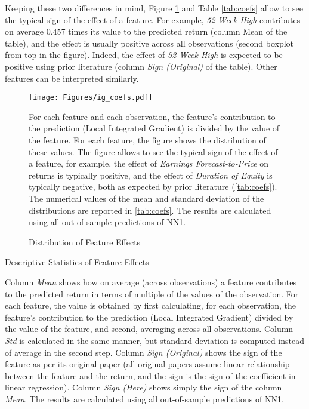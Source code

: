 	Keeping these two differences in mind, Figure \ref{fig:coefs} and Table \ref{tab:coefs} allow to see the typical sign of the effect of a feature. For example, \textit{52-Week High} contributes on average 0.457 times its value to the predicted return (column Mean of the table), and the effect is usually positive across all observations (second boxplot from top in the figure). Indeed, the effect of \textit{52-Week High} is expected to be positive using prior literature (column \textit{Sign (Original)} of the table). Other features can be interpreted similarly.  
	
	\begin{figure}
		\texttt{[image: Figures/ig\_coefs.pdf]}
		\caption{Distribution of Feature Effects}
		\label{fig:coefs}
		\medskip
		\small
		For each feature and each observation, the feature's contribution to the prediction (Local Integrated Gradient) is divided by the value of the feature. For each feature, the figure shows the distribution of these values.   The figure allows to see the typical sign of the effect of a feature, for example, the effect of \textit{Earnings Forecast-to-Price} on returns is typically positive, and the effect of \textit{Duration of Equity} is typically negative, both as expected by prior literature (\ref{tab:coefs}). The numerical values of the mean and standard deviation of the distributions are reported in \ref{tab:coefs}. The results are calculated using all out-of-sample predictions of NN1. 
	\end{figure} 
	
	\begin{table}
		\resizebox{\textwidth}{!}{}
		\caption{Descriptive Statistics of Feature Effects}
		\label{tab:coefs}
		\medskip
		\small
		Column \textit{Mean} shows how on average (across observations) a feature contributes to the predicted return in terms of multiple of the values of the observation. For each feature, the value is obtained by first calculating, for each observation, the feature's contribution to the prediction (Local Integrated Gradient) divided by the value of the feature, and second, averaging across all observations. Column \textit{Std} is calculated in the same manner, but standard deviation is computed instead of average in the second step. Column \textit{Sign (Original)} shows the sign of the feature as per its original paper (all original papers assume linear relationship between the feature and the return, and the sign is the sign of the coefficient in linear regression). Column \textit{Sign (Here)} shows simply the sign of the column \textit{Mean}. The results are calculated using all out-of-sample predictions of NN1.
	\end{table}
	
